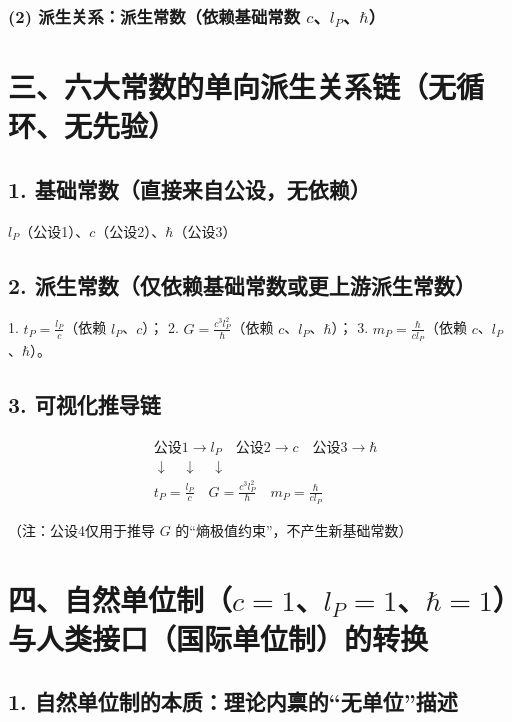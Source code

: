 \documentclass{article}
\begin{document}
\subsubsection*{(2) 派生关系：派生常数（依赖基础常数 \( c \)、\( l_P \)、\( \hbar \)）}

\section*{三、六大常数的单向派生关系链（无循环、无先验）}

\subsection*{1. 基础常数（直接来自公设，无依赖）}

\( \boxed{l_P} \)（公设1）、\( \boxed{c} \)（公设2）、\( \boxed{\hbar} \)（公设3）

\subsection*{2. 派生常数（仅依赖基础常数或更上游派生常数）}

1. \( \boxed{t_P} = \frac{l_P}{c} \)（依赖 \( l_P \)、\( c \)）；
2. \( \boxed{G} = \frac{c^3 l_P^2}{\hbar} \)（依赖 \( c \)、\( l_P \)、\( \hbar \)）；
3. \( \boxed{m_P} = \frac{\hbar}{c l_P} \)（依赖 \( c \)、\( l_P \)、\( \hbar \)）。

\subsection*{3. 可视化推导链}

\[
\begin{aligned}
&\text{公设1} \to l_P \quad \text{公设2} \to c \quad \text{公设3} \to \hbar \\
&\downarrow \quad \downarrow \quad \downarrow \\
&t_P = \frac{l_P}{c} \quad G = \frac{c^3 l_P^2}{\hbar} \quad m_P = \frac{\hbar}{c l_P}
\end{aligned}
\]

（注：公设4仅用于推导 \( G \) 的“熵极值约束”，不产生新基础常数）

\section*{四、自然单位制（\( c=1 \)、\( l_P=1 \)、\( \hbar=1 \)）与人类接口（国际单位制）的转换}

\subsection*{1. 自然单位制的本质：理论内禀的“无单位”描述}
\end{document}
